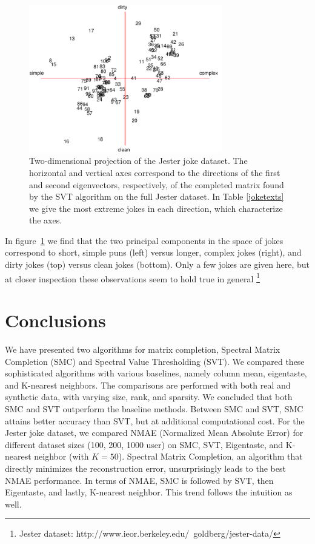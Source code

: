 \documentclass{article} %
\begin{document}
\begin{figure} [h]
\centering
\includegraphics[width = 0.75\textwidth]{jokes_2d_2.pdf}
\caption{Two-dimensional projection of the Jester joke dataset. The
  horizontal and vertical axes correspond to the directions of the
  first and second eigenvectors, respectively, of the completed matrix
  found by the SVT algorithm on the full Jester dataset. In Table
  \ref{joketexts} we give the most extreme jokes in each direction,
  which characterize the axes.}
\label{jokes2d}
\end{figure}

In figure~\ref{jokes2d} we find that the two principal components in
the space of jokes correspond to short, simple puns (left) versus
longer, complex jokes (right), and dirty jokes (top) versus clean
jokes (bottom). Only a few jokes are given here, but at closer
inspection these observations seem to hold true in general
\footnote{Jester dataset:
  http://www.ieor.berkeley.edu/~goldberg/jester-data/}


\section{Conclusions}

We have presented two algorithms for matrix completion, Spectral
Matrix Completion (SMC) and Spectral Value Thresholding (SVT). We
compared these sophisticated algorithms with various baselines, namely
column mean, eigentaste, and K-nearest neighbors. The comparisons are
performed with both real and synthetic data, with varying size, rank,
and sparsity. We concluded that both SMC and SVT outperform the
baseline methods. Between SMC and SVT, SMC attains better accuracy
than SVT, but at additional computational cost. For the Jester joke
dataset, we compared NMAE (Normalized Mean Absolute Error) for
different dataset sizes ({100, 200, 1000} user) on SMC, SVT,
Eigentaste, and K-nearest neighbor (with $K=50$). Spectral Matrix
Completion, an algorithm that directly minimizes the reconstruction
error, unsurprisingly leads to the best NMAE performance. In terms of
NMAE, SMC is followed by SVT, then Eigentaste, and lastly, K-nearest
neighbor. This trend follows the intuition as well.
\end{document}
